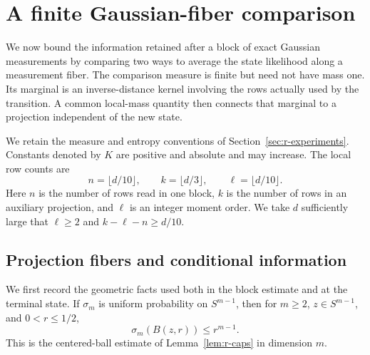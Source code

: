 \section{A finite Gaussian-fiber comparison}\label{sec:r-fiber}

We now bound the information retained after a block of exact Gaussian
measurements by comparing two ways to average the state likelihood along
a measurement fiber.  The comparison measure is finite but need not have
mass one.  Its marginal is an inverse-distance kernel involving the rows
actually used by the transition.  A common local-mass quantity then
connects that marginal to a projection independent of the new state.

We retain the measure and entropy conventions of
Section~\ref{sec:r-experiments}.  Constants denoted by \(K\) are
positive and absolute and may increase.  The local row counts are
\begin{equation}\label{rfib:parameters}
 n=\lfloor d/10\rfloor,\qquad
 k=\lfloor d/3\rfloor,\qquad
 \ell=\lfloor d/10\rfloor.
\end{equation}
Here \(n\) is the number of rows read in one block, \(k\) is the number
of rows in an auxiliary projection, and \(\ell\) is an integer moment
order.  We take \(d\) sufficiently large that \(\ell\ge2\) and
\(k-\ell-n\ge d/10\).

\subsection{Projection fibers and conditional information}

We first record the geometric facts used both in the block estimate and
at the terminal state.  If \(\sigma_m\) is uniform probability on
\(S^{m-1}\), then for \(m\ge2\), \(z\in S^{m-1}\), and \(0<r\le1/2\),
\begin{equation}\label{rfib:cap}
 \sigma_m(B(z,r))\le r^{m-1}.
\end{equation}
This is the centered-ball estimate of Lemma~\ref{lem:r-caps} in
dimension \(m\).

